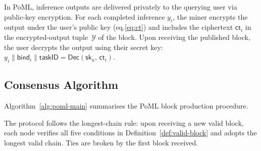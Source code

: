 In PoML, inference outputs are delivered privately to the querying user via public-key encryption. For each completed inference $y_i$, the miner encrypts the output under the user's public key (eq.\ref{eq:ct})
and includes the ciphertext $\mathsf{ct}_i$ in the encrypted-output tuple~$\mathcal{Y}$ of the block. Upon receiving the published block, the user decrypts the output using their secret key: $y_i \parallel \mathsf{bind}_i \parallel \mathsf{taskID} = \mathsf{Dec}(\mathsf{sk}_u,\, \mathsf{ct}_i)$. 

\subsection{Consensus Algorithm}

Algorithm~\ref{alg:poml-main} summarises the PoML block production procedure.

The protocol follows the longest-chain rule: upon receiving a new valid block, each node verifies all five conditions in Definition~\ref{def:valid-block} and adopts the longest valid chain. Ties are broken by the first block received.

